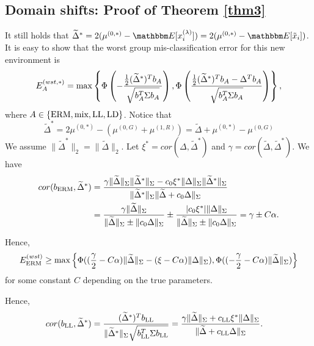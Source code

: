 \subsection{Domain shifts: Proof of Theorem \ref{thm3}}
It still holds that $\widetilde{\Delta}^*=2(\mu^{(0,*)}-\E[x_i^{(\lam)}])=2(\mu^{(0,*)}-\E[\tx_i])$.
It is easy to show that the worst group mis-classification error for this new environment is
\begin{align}
  E^{(wst,*)}_A=\max\left\{\Phi\left(-\frac{\frac{1}{2}(\widetilde{\Delta}^*)^Tb_A}{\sqrt{b_A^T\Sigma b_A}}\right),\Phi\left(\frac{\frac{1}{2}(\widetilde{\Delta}^*)^Tb_A-\Delta^Tb_A}{\sqrt{b_A^T\Sigma b_A}}\right)\right\},
\end{align}
where $A\in\{\textup{ERM},\textup{mix}, \textup{LL},\textup{LD}\}$.
Notice that
\[
 \widetilde{\Delta}^*=2\mu^{(0,*)}-(\mu^{(0,G)}+\mu^{(1,R)})=\widetilde{\Delta}+\mu^{(0,*)}-\mu^{(0,G)}
\]
We assume $\|\widetilde{\Delta}^*\|_2=\|\widetilde{\Delta}\|_2$.
Let $\xi^*=cor(\Delta,\widetilde{\Delta}^*)$ and $\gamma=cor(\widetilde{\Delta},\widetilde{\Delta}^*)$.
We have
\begin{align*}
    cor(b_{\textup{ERM}},\widetilde{\Delta}^*)&=\frac{\gamma\|\widetilde{\Delta}\|_{\Sigma}\|\widetilde{\Delta}^*\|_{\Sigma}-c_0\xi^*\|\Delta\|_{\Sigma}\|\widetilde{\Delta}^*\|_{\Sigma}}{\|\widetilde{\Delta}^*\|_{\Sigma}\|\widetilde{\Delta}+c_0\Delta\|_{\Sigma}}\\
    &= \frac{\gamma \|\widetilde{\Delta}\|_{\Sigma}}{\|\widetilde{\Delta}\|_{\Sigma}\pm \|c_0\Delta\|_{\Sigma}}\pm\frac{|c_0\xi^*|\|\Delta\|_{\Sigma}}{\|\widetilde{\Delta}\|_{\Sigma}\pm \|c_0\Delta\|_{\Sigma}}= \gamma\pm C\alpha.
\end{align*}

Hence,
\begin{align}
\label{err0-lb}
    E_{\textup{ERM}}^{(wst)}\geq \max\left\{\Phi((\frac{\gamma}{2}-C\alpha)\|\widetilde{\Delta}\|_{\Sigma}-(\xi-C\alpha)\|\Delta\|_{\Sigma}),\Phi((-\frac{\gamma}{2}-C\alpha)\|\widetilde{\Delta}\|_{\Sigma})\right\}
\end{align}
 for some constant $C$ depending on the true parameters.

 Hence,
 \begin{align*}
cor(b_{\textup{LL}},\widetilde{\Delta}^*)&=\frac{ (\widetilde{\Delta}^*)^T b_{\textup{LL}}}{\|\widetilde{\Delta}^*\|_{\Sigma}\sqrt{b_{\textup{LL}}^T\Sigma b_{\textup{LL}}}} =\frac{\gamma\|\widetilde{\Delta}\|_{\Sigma}+c_{\textup{LL}}\xi^*\|\Delta\|_{\Sigma}}{\|\widetilde{\Delta}+c_{\textup{LL}}\Delta\|_{\Sigma}}.
\end{align*}

